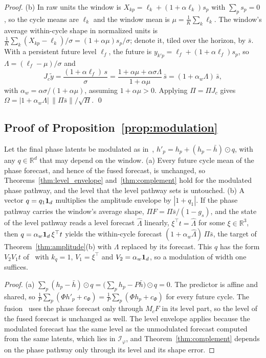 {\begin{proof}
(b) In raw units the window is $X_{kp}=\ell_k+(1+\alpha\ell_k)s_p$ with $\sum_ps_p=0$, so the cycle means are $\ell_k$ and the window mean is $\mu=\tfrac1K\sum_k\ell_k$. The window's average within-cycle shape in normalized units is $\tfrac1K\sum_k(X_{kp}-\ell_k)/\sigma=(1+\alpha\mu)s_p/\sigma$; denote it, tiled over the horizon, by $\bar s$. With a persistent future level $\ell_f$, the future is $y_{k'p}=\ell_f+(1+\alpha\ell_f)s_p$, so $\Lambda=(\ell_f-\mu)/\sigma$ and
\begin{equation*}
J_c\tilde y=\frac{(1+\alpha\ell_f)\,s}{\sigma}
=\frac{1+\alpha\mu+\alpha\sigma\Lambda}{1+\alpha\mu}\,\bar s
=(1+\alpha_w\Lambda)\,\bar s ,
\end{equation*}
with $\alpha_w=\alpha\sigma/(1+\alpha\mu)$, assuming $1+\alpha\mu>0$. Applying $\Pi=\Pi J_c$ gives $\Omega=|1+\alpha_w\Lambda|\,\|\Pi\bar s\|/\sqrt H$. \qed
\end{proof}



\subsection{Proof of Proposition~\ref{prop:modulation}}

 Let the final phase latents be modulated as in~, $h'_p=h_p+(h_p-\bar h)\odot q$, with any $q\in\mathbb R^d$ that may depend on the window.
(a) Every future cycle mean of the phase forecast, and hence of the fused forecast, is unchanged, so Theorems~\ref{thm:level_envelope} and~\ref{thm:complement} hold for the modulated phase pathway, and the level that the level pathway sets is untouched.
(b) A vector $q=q_1\mathbf 1_d$ multiplies the amplitude envelope by $|1+q_1|$. If the phase pathway carries the window's average shape, $\Pi F=\Pi\bar s/(1-g_s)$, and the state of the level pathway reads a level forecast $\hat\Lambda$ linearly, $\xi^\top t=\hat\Lambda$ for some $\xi\in\mathbb R^3$, then $q=\alpha_w\mathbf 1_d\,\xi^\top t$ yields the within-cycle forecast $(1+\alpha_w\hat\Lambda)\,\Pi\bar s$, the target of Theorem~\ref{thm:amplitude}(b) with $\Lambda$ replaced by its forecast. This $q$ has the form $V_2V_1t$ of~ with $k_q=1$, $V_1=\xi^\top$ and $V_2=\alpha_w\mathbf 1_d$, so a modulation of width one suffices.

\begin{proof}
(a) $\sum_p(h_p-\bar h)\odot q=\big(\sum_ph_p-P\bar h\big)\odot q=0$. The predictor is affine and shared, so $\tfrac1P\sum_p(\Phi h'_p+c_\Phi)=\tfrac1P\sum_p(\Phi h_p+c_\Phi)$ for every future cycle. The fusion~ uses the phase forecast only through $M_cF$ in its level part, so the level of the fused forecast is unchanged as well. The level envelope applies because the modulated forecast has the same level as the unmodulated forecast computed from the same latents, which lies in $\mathcal I_\varphi$, and Theorem~\ref{thm:complement} depends on the phase pathway only through its level and its shape error.


\end{proof}}
